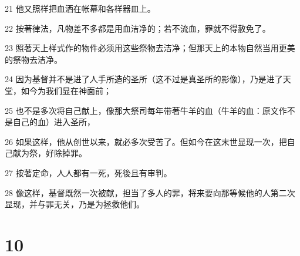 \par 21 他又照样把血洒在帐幕和各样器皿上。
\par 22 按著律法，凡物差不多都是用血洁净的；若不流血，罪就不得赦免了。
\par 23 照著天上样式作的物件必须用这些祭物去洁净；但那天上的本物自然当用更美的祭物去洁净。
\par 24 因为基督并不是进了人手所造的圣所（这不过是真圣所的影像），乃是进了天堂，如今为我们显在神面前；
\par 25 也不是多次将自己献上，像那大祭司每年带著牛羊的血（牛羊的血：原文作不是自己的血）进入圣所，
\par 26 如果这样，他从创世以来，就必多次受苦了。但如今在这末世显现一次，把自己献为祭，好除掉罪。
\par 27 按著定命，人人都有一死，死後且有审判。
\par 28 像这样，基督既然一次被献，担当了多人的罪，将来要向那等候他的人第二次显现，并与罪无关，乃是为拯救他们。

\chapter{10}

